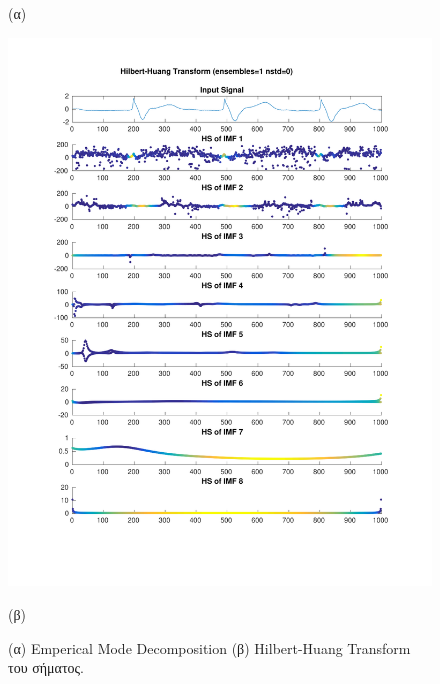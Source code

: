 \documentclass[11pt,a4paper]{article}
\begin{document}
\begin{figure}[H]
\begin{minipage}{0.48\textwidth}
	(α)
\end{minipage}
\begin{minipage}{0.48\textwidth}
	\centering
	\includegraphics[width=\textwidth]{fig/217l1_hht.pdf}
	
	(β)
\end{minipage}
\vfill
\caption{(α) Emperical Mode Decomposition (β) Hilbert-Huang Transform του σήματος.}
\label{fig:217l1_hht}
\end{figure}
\end{document}
